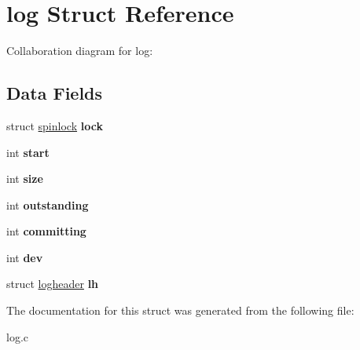 \hypertarget{structlog}{}\section{log Struct Reference}
\label{structlog}


Collaboration diagram for log\+:
\subsection*{Data Fields}
\begin{DoxyCompactItemize}
\item 
struct \hyperlink{structspinlock}{spinlock} {\bfseries lock}\hypertarget{structlog_a980a1d1aa9c60af7a82f297f8ab54d2e}{}\label{structlog_a980a1d1aa9c60af7a82f297f8ab54d2e}

\item 
int {\bfseries start}\hypertarget{structlog_a28d847dd722497fa3497b14f68267618}{}\label{structlog_a28d847dd722497fa3497b14f68267618}

\item 
int {\bfseries size}\hypertarget{structlog_a2257e716d4b77efd0524286cf5772a41}{}\label{structlog_a2257e716d4b77efd0524286cf5772a41}

\item 
int {\bfseries outstanding}\hypertarget{structlog_addfc1fc09a124978bd7e2a23a19d733d}{}\label{structlog_addfc1fc09a124978bd7e2a23a19d733d}

\item 
int {\bfseries committing}\hypertarget{structlog_afc034b98b98897c179ca8fae8e2ee181}{}\label{structlog_afc034b98b98897c179ca8fae8e2ee181}

\item 
int {\bfseries dev}\hypertarget{structlog_aebeeb9df7326549fb5d8b7221c9b0aa3}{}\label{structlog_aebeeb9df7326549fb5d8b7221c9b0aa3}

\item 
struct \hyperlink{structlogheader}{logheader} {\bfseries lh}\hypertarget{structlog_a7808516ed2f708dcb13912b1e8fc20d9}{}\label{structlog_a7808516ed2f708dcb13912b1e8fc20d9}

\end{DoxyCompactItemize}


The documentation for this struct was generated from the following file\+:\begin{DoxyCompactItemize}
\item 
log.\+c\end{DoxyCompactItemize}
